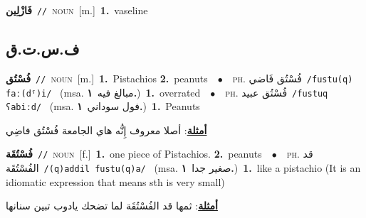 \documentclass[10pt,a4paper,twoside]{article} %
\begin{document}
\begin{multicols}{2}
{\setlength\topsep{0pt}\textbf{\foreignlanguage{arabic}{فَازْلِين}}\ {\color{gray}\texttt{//}\color{black}}\ \textsc{noun}\ [m.]\ \textbf{1.}~vaseline\ } \vspace{2mm}

\vspace{-3mm}
\subsection*{\color{blue}\foreignlanguage{arabic}{ف.س.ت.ق}\color{blue}{}} 

{\setlength\topsep{0pt}\textbf{\foreignlanguage{arabic}{فُسْتُق}}\ {\color{gray}\texttt{//}\color{black}}\ \textsc{noun}\ [m.]\ \textbf{1.}~Pistachios  \textbf{2.}~peanuts\ \ $\bullet$\ \ \textsc{ph.} \color{gray} \foreignlanguage{arabic}{فُسْتُق فَاضي}\color{black}\ {\color{gray}\texttt{/{\sffamily fustu(q) faː(dˤ)i}/}\color{black}}\ \color{gray} (msa. \foreignlanguage{arabic}{مبالغ فيه}~\foreignlanguage{arabic}{\textbf{١.}})\color{black}\ \textbf{1.}~overrated\ \ $\bullet$\ \ \textsc{ph.} \color{gray} \foreignlanguage{arabic}{فُسْتُق عبيد}\color{black}\ {\color{gray}\texttt{/{\sffamily fustuq ʕabiːd}/}\color{black}}\ \color{gray} (msa. \foreignlanguage{arabic}{فول سوداني}~\foreignlanguage{arabic}{\textbf{١.}})\color{black}\ \textbf{1.}~Peanuts\  \begin{flushright}\color{gray}\foreignlanguage{arabic}{\textbf{\underline{\foreignlanguage{arabic}{أمثلة}}}: أصلا معروف إِنُّه هاي الجامعة فُسْتُق فاضِي}\end{flushright}\color{black}} \vspace{2mm}

{\setlength\topsep{0pt}\textbf{\foreignlanguage{arabic}{فُسْتُقَة}}\ {\color{gray}\texttt{//}\color{black}}\ \textsc{noun}\ [f.]\ \textbf{1.}~one piece of Pistachios.  \textbf{2.}~peanuts\ \ $\bullet$\ \ \textsc{ph.} \color{gray} \foreignlanguage{arabic}{قد الفُسْتُقَة}\color{black}\ {\color{gray}\texttt{/{\sffamily (q)addil fustu(q)a}/}\color{black}}\ \color{gray} (msa. \foreignlanguage{arabic}{صغير جدا}~\foreignlanguage{arabic}{\textbf{١.}})\color{black}\ \textbf{1.}~like a pistachio (It is an idiomatic expression that means sth is very small)\  \begin{flushright}\color{gray}\foreignlanguage{arabic}{\textbf{\underline{\foreignlanguage{arabic}{أمثلة}}}: ثمها قد الفُسْتُقَة لما تضحك يادوب تبين سنانها}\end{flushright}\color{black}} \vspace{2mm}


\end{multicols}
\end{document}
